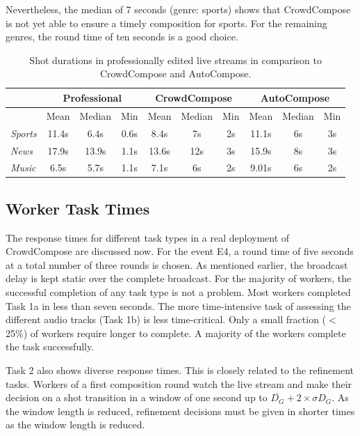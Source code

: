 Nevertheless, the median of 7 seconds (genre: sports) shows that CrowdCompose is not yet able to ensure a timely composition for sports. 
For the remaining genres, the round time of ten seconds is a good choice.

\begin{table}[hb]
	\centering 
	\caption[Shot durations of composition approaches]{Shot durations in professionally edited live streams in comparison to CrowdCompose and AutoCompose.}
	\begin{tabular}{lccccccccc} 
		\toprule
		& \multicolumn{3}{c}{Professional} & \multicolumn{3}{c}{CrowdCompose} & \multicolumn{3}{c}{AutoCompose}\\
		\hline
		& Mean  & Median & Min & Mean  & Median & Min & Mean  & Median & Min\\
		\hline
		\textit{Sports} & 11.4s & 6.4s & 0.6s & 8.4s & 7s & 2s & 11.1s & 6s & 3s \\ 
		\textit{News} & 17.9s  & 13.9s & 1.1s & 13.6s & 12s & 3s & 15.9s & 8s & 3s\\ 
		\textit{Music}& 6.5s  & 5.7s & 1.1s & 7.1s & 6s & 2s  & 9.01s & 6s & 2s\\ 
		\bottomrule
	\end{tabular} 
	\label{tab:690_shots}
\end{table}

\subsection{Worker Task Times}
The response times for different task types in a real deployment of CrowdCompose are discussed now. 
For the event E4, a round time of five seconds at a total number of three rounds is chosen. 
As mentioned earlier, the broadcast delay is kept static over the complete broadcast. 
For the majority of workers, the successful completion of any task type is not a problem.
Most workers completed Task 1a in less than seven seconds. 
The more time-intensive task of assessing the different audio tracks (Task 1b) is less time-critical. 
Only a small fraction ($<$ 25\%) of workers require longer to complete. 
A majority of the workers complete the task successfully.

Task 2 also shows diverse response times. 
This is closely related to the refinement tasks. 
Workers of a first composition round watch the live stream and make their decision on a shot transition in a window of one second up to $\overline{D_{G}} + 2 \times \sigma D_{G}$.
As the window length is reduced, refinement decisions must be given in shorter times as the window length is reduced. 
